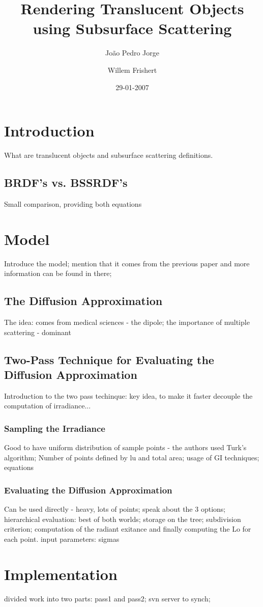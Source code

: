 \documentclass{article}
\title{Rendering Translucent Objects using Subsurface Scattering}
\author{Jo\~{a}o Pedro Jorge \and Willem Frishert}
\date{29-01-2007}
\begin{document}
\maketitle

\section{Introduction}
What are translucent objects and subsurface scattering definitions.
\subsection{BRDF's vs. BSSRDF's}
Small comparison, providing both equations

\section{Model}
Introduce the model; mention that it comes from the previous paper and more information can be found in there;
\subsection{The Diffusion Approximation}
The idea: comes from medical sciences - the dipole; the importance of multiple scattering - dominant
\subsection{Two-Pass Technique for Evaluating the Diffusion Approximation}
Introduction to the two pass techinque: key idea, to make it faster decouple the computation of irradiance...
\subsubsection{Sampling the Irradiance}
Good to have uniform distribution of sample points - the authors used Turk's algorithm; Number of points defined by lu and total area; usage of GI techniques;
equations
\subsubsection{Evaluating the Diffusion Approximation}
Can be used directly - heavy, lots of points; speak about the 3 options; hierarchical evaluation: best of both worlds; storage on the tree; subdivision criterion; computation of the radiant exitance and finally computing the Lo for each point.
input parameters: sigmas

\section{Implementation}
divided work into two parts: pass1 and pass2; svn server to synch; 
\end{document}
